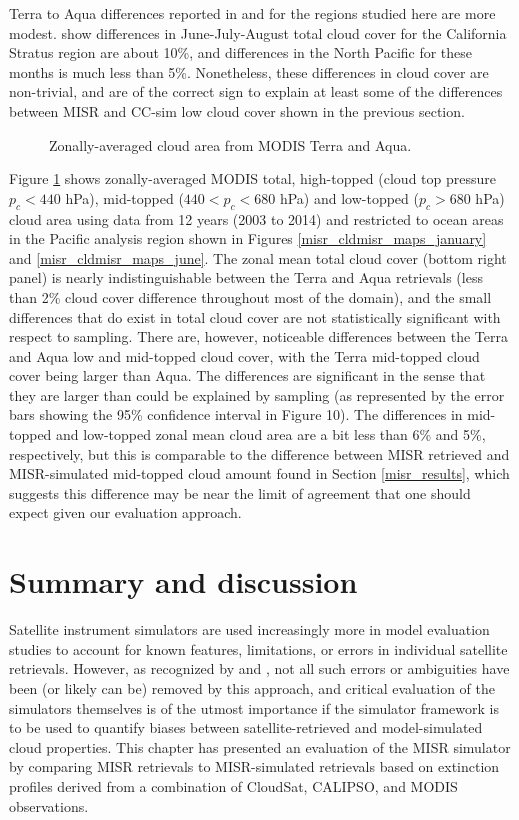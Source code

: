 Terra to Aqua differences reported in \cite{king_et_al_2013} and \cite{meskhidze_et_al_2009} for the regions studied here are more modest. \cite{king_et_al_2013} show differences in June-July-August total cloud cover for the California Stratus region are about 10\%, and differences in the North Pacific for these months is much less than 5\%. Nonetheless, these differences in cloud cover are non-trivial, and are of the correct sign to explain at least some of the differences between MISR and CC-sim low cloud cover shown in the previous section.

\begin{figure}
\centering
\caption{Zonally-averaged cloud area from MODIS Terra and Aqua.}
\label{misr_cldmodis_zonal}
\end{figure}

Figure \ref{misr_cldmodis_zonal} shows zonally-averaged MODIS total, high-topped (cloud top pressure $p_c < 440$ hPa), mid-topped ($440 < p_c < 680$ hPa) and low-topped ($p_c > 680$ hPa) cloud area using data from 12 years (2003 to 2014) and restricted to ocean areas in the Pacific analysis region shown in Figures \ref{misr_cldmisr_maps_january} and \ref{misr_cldmisr_maps_june}. The zonal mean total cloud cover (bottom right panel) is nearly indistinguishable between the Terra and Aqua retrievals (less than 2\% cloud cover difference throughout most of the domain), and the small differences that do exist in total cloud cover are not statistically significant with respect to sampling. There are, however, noticeable differences between the Terra and Aqua low and mid-topped cloud cover, with the Terra mid-topped cloud cover being larger than Aqua. The differences are significant in the sense that they are larger than could be explained by sampling (as represented by the error bars showing the 95\% confidence interval in Figure 10). The differences in mid-topped and low-topped zonal mean cloud area are a bit less than 6\% and 5\%, respectively, but this is comparable to the difference between MISR retrieved and MISR-simulated mid-topped cloud amount found in Section \ref{misr_results}, which suggests this difference may be near the limit of agreement that one should expect given our evaluation approach.

\section{Summary and discussion}
\label{misr_summary}
Satellite instrument simulators are used increasingly more in model evaluation studies to account for known features, limitations, or errors in individual satellite retrievals. However, as recognized by \cite{pincus_et_al_2012} and \cite{mace_et_al_2011}, not all such errors or ambiguities have been (or likely can be) removed by this approach, and critical evaluation of the simulators themselves is of the utmost importance if the simulator framework is to be used to quantify biases between satellite-retrieved and model-simulated cloud properties. This chapter has presented an evaluation of the MISR simulator by comparing MISR retrievals to MISR-simulated retrievals based on extinction profiles derived from a combination of CloudSat, CALIPSO, and MODIS observations. 

